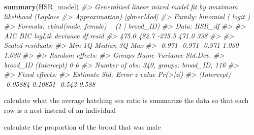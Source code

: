 \documentclass[]{article}
\newenvironment{Shaded}{\begin{snugshade}}{\end{snugshade}}
\newcommand{\KeywordTok}[1]{\textcolor[rgb]{0.13,0.29,0.53}{\textbf{{#1}}}}
\newcommand{\DataTypeTok}[1]{\textcolor[rgb]{0.13,0.29,0.53}{{#1}}}
\newcommand{\StringTok}[1]{\textcolor[rgb]{0.31,0.60,0.02}{{#1}}}
\newcommand{\CommentTok}[1]{\textcolor[rgb]{0.56,0.35,0.01}{\textit{{#1}}}}
\newcommand{\NormalTok}[1]{{#1}}
\begin{document}
\begin{Shaded}
\begin{Highlighting}[]
\KeywordTok{summary}\NormalTok{(HSR_model)}
\CommentTok{#> Generalized linear mixed model fit by maximum likelihood (Laplace}
\CommentTok{#>   Approximation) [glmerMod]}
\CommentTok{#>  Family: binomial  ( logit )}
\CommentTok{#> Formula: cbind(male, female) ~ (1 | brood_ID)}
\CommentTok{#>    Data: HSR_df}
\CommentTok{#> }
\CommentTok{#>      AIC      BIC   logLik deviance df.resid }
\CommentTok{#>    475.0    482.7   -235.5    471.0      338 }
\CommentTok{#> }
\CommentTok{#> Scaled residuals: }
\CommentTok{#>    Min     1Q Median     3Q    Max }
\CommentTok{#> -0.971 -0.971 -0.971  1.030  1.030 }
\CommentTok{#> }
\CommentTok{#> Random effects:}
\CommentTok{#>  Groups   Name        Variance Std.Dev.}
\CommentTok{#>  brood_ID (Intercept) 0        0       }
\CommentTok{#> Number of obs: 340, groups:  brood_ID, 116}
\CommentTok{#> }
\CommentTok{#> Fixed effects:}
\CommentTok{#>             Estimate Std. Error z value Pr(>|z|)}
\CommentTok{#> (Intercept) -0.05884    0.10851  -0.542    0.588}
\end{Highlighting}
\end{Shaded}

calculate what the average hatching sex ratio is summarize the data so
that each row is a nest instead of an individual

\begin{Shaded}
\end{Shaded}

calculate the proportion of the brood that was male

\begin{Shaded}
\end{Shaded}
\end{document}
